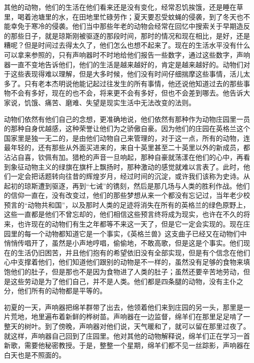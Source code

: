 其他的动物，他们的生活在他们看来还是没有变化，经常忍饥挨饿，还是睡在草里，喝着池塘里的水，在田地里忙碌劳作；夏天要忍受蚊蝇的侵袭，到了冬天也不能幸免于寒冷的侵袭。他们当中那些年老的动物会经常在回忆中搜索关于早期造反的那些日子，就是琼斯刚被驱逐的那段时间，那时的情况和现在相比，是好，还是糟呢？但是时间过去得太久了，他们怎么也想不起来了。现在的生活水平没有什么可以拿来参照的，只有声响器时不时地给他们报告一些数字，通过这些数字，声响器一直不变地告诉他们，他们的生活是越来越好的，肯定是越来越好的。动物们对于这些表现得难以理解，但是大多时候，他们没有时间仔细揣摩这些事情，活儿太多了。只有老本杰明说他能记起过往发生的所有事情，他还说他知道过去的那些事物不会有多好，现在的也不会，将来更不会有多好，但也不会差到哪去。他告诉大家说，饥饿、痛苦、磨难、失望是现实生活中无法改变的法则。

动物们依然有他们自己的念想，更准确地说，他们依然有那种作为动物庄园里一员的那种自身优越感，这种荣誉让他们为之骄傲自豪。因为他们的庄园在英格兰这个国家里是独一无二的，是由他们动物自己来管理的，对于这一点，所有的动物，连最年轻的，还有那些从外面买进来的，来自十英里甚至二十英里以外的新成员，都沾沾自喜，钦佩有加。猎枪的声音一旦响起，那种自豪就荡漾在他们的心中，再看到象征动物主义的绿旗在旗杆上飘扬时，那种激动的感觉就难以言表了。此时，他们一定会把话题转向往昔的辉煌岁月，经过时间的沉淀，或许我们该称为史诗。从起初的琼斯遭到驱逐，再到“七诫”的镌刻，然后是那几场与人类的胜利作战。他们的信仰一直在，没有改变过，他们的那些梦想从来一个都没有忘记过，当年老少校预言的“动物共和国”，以及那时人类的足迹将消失在所有的英格兰的绿色原野上，这些一直都是他们不曾忘却的，他们相信这些预言终将成为现实，也许在不久的将来，也许现在的动物们有生之年都等不来这一天了，但是它一定会实现的。现在庄园里的每一个动物都知道它是一个事实，《英格兰兽》这支曲子已经又在动物们中悄悄传唱开了，虽然是小声地哼唱，偷偷地，不敢高歌，但是这是个事实。他们现在的生活仍旧困苦，并且他们抱有的希望依旧没有全部实现，但是有个信念在他们心中支撑着他们，他们知道他们跟别的动物是不一样的，虽然没有足够的食物来填饱他们的肚子，但是那也不是因为食物进了人类的肚子；虽然还要辛苦地劳动，但是这些劳动是为了他们自己，并不是人类。他们都是四条腿的动物，没有主仆之分，他们所有的动物都是平等的。

初夏的一天，声响器把绵羊群带了出去，他领着他们来到庄园的另一头，那里是一片荒地，地里遍布着新鲜的桦树苗。声响器在一边监督，绵羊们在那里足足啃了一整天的树叶。到了傍晚，声响器对他们说，天气暖和了，就可以留在那里过夜了。就这样，声响器自己回到了庄园里。他对其他的动物解释说，绵羊们正在学习一首新歌，需要他秘密教授。于是，整整一个星期，绵羊们都不见一丝踪影，声响器在白天也是不照面的。

